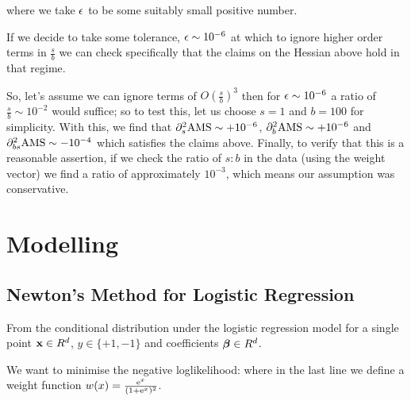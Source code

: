 \begin{appendices}


where we take $\epsilon$ to be some suitably small positive number.

If we decide to take some tolerance, $\epsilon \sim 10^{-6}$ at which to ignore higher order terms in $\frac{s}{b}$ we can check specifically that the claims on the Hessian above hold in that regime.

So, let's assume we can ignore terms of $O(\frac{s}{b})^3$ then for $\epsilon\sim 10^{-6}$ a ratio of $\frac{s}{b}\sim 10^{-2}$ would suffice; so to test this, let us choose $s=1$ and $b=100$ for simplicity.
With this, we find that $\partial_s^2\rm{AMS} \sim +10^{-6}$, $\partial_b^2\rm{AMS} \sim +10^{-6}$ and $\partial_{bs}^2\rm{AMS} \sim -10^{-4}$ which satisfies the claims above.
Finally, to verify that this is a reasonable assertion, if we check the ratio of $s:b$ in the data (using the weight vector) we find a ratio of approximately $10^{-3}$, which means our assumption was conservative. 


\section{Modelling}

\subsection{Newton's Method for Logistic Regression}

From the conditional distribution under the logistic regression model for a single point $\mathbf{x} \in R^d$, $y \in \{+1,-1\}$ and coefficients $\bm{\beta} \in R^d$.

We want to minimise the negative loglikelihood:
where in the last line we define a weight function $w(x) = \frac{\mathrm{e}^x}{(1+\mathrm{e}^x)^2}$.


\end{appendices}
